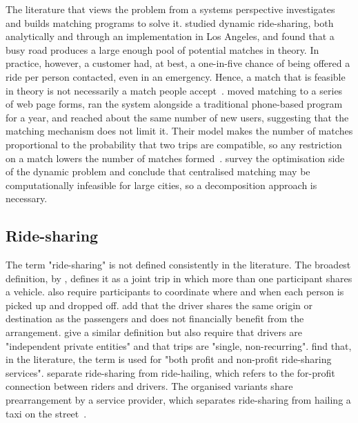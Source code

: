 The literature that views the problem from a systems perspective investigates and builds matching programs to solve it. \citet{hall1997dynamic} studied dynamic ride-sharing, both analytically and through an implementation in Los Angeles, and found that a busy road produces a large enough pool of potential matches in theory. In practice, however, a customer had, at best, a one-in-five chance of being offered a ride per person contacted, even in an emergency. Hence, a match that is feasible in theory is not necessarily a match people accept~\citep{hall1997dynamic}. \citet{dailey1999seattle} moved matching to a series of web page forms, ran the system alongside a traditional phone-based program for a year, and reached about the same number of new users, suggesting that the matching mechanism does not limit it. Their model makes the number of matches proportional to the probability that two trips are compatible, so any restriction on a match lowers the number of matches formed~\citep{dailey1999seattle}. \citet{agatz2012optimization} survey the optimisation side of the dynamic problem and conclude that centralised matching may be computationally infeasible for large cities, so a decomposition approach is necessary.

\subsection{Ride-sharing}

The term "ride-sharing" is not defined consistently in the literature. The broadest definition, by \citet{furuhata2013ridesharing}, defines it as a joint trip in which more than one participant shares a vehicle. \citet{furuhata2013ridesharing} also require participants to coordinate where and when each person is picked up and dropped off. \citet{chan2012ridesharing} add that the driver shares the same origin or destination as the passengers and does not financially benefit from the arrangement. \citet{agatz2012optimization} give a similar definition but also require that drivers are "independent private entities" and that trips are "single, non-recurring". \citet{mitropoulos2021systematic} find that, in the literature, the term is used for "both profit and non-profit ride-sharing services". \citet{pigalle2023ridesharing} separate ride-sharing from ride-hailing, which refers to the for-profit connection between riders and drivers. The organised variants share prearrangement by a service provider, which separates ride-sharing from hailing a taxi on the street~\citep{furuhata2013ridesharing}.

